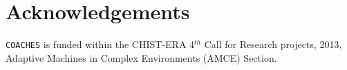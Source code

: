 \documentclass{llncs}
\def\coaches{{\tt COACHES} }
\begin{document}








\section*{Acknowledgements}

\coaches is funded within the CHIST-ERA 4$^{th}$ Call for Research projects, 2013,
Adaptive Machines in Complex Environments (AMCE) Section.




\end{document}
